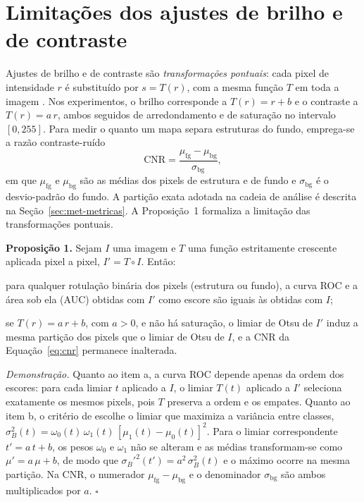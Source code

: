 \documentclass[12pt, oneside, a4paper, chapter=TITLE, section=TITLE,
               english, brazil]{abntex2}
\newcommand{\secao}[1]{\section[\texorpdfstring{\protect\MakeTextUppercase{#1}}{#1}]{#1}}
\newcommand{\cnr}{\mathrm{CNR}}
\begin{document}
\secao{Limitações dos ajustes de brilho e de contraste}
\label{sec:brilho}

Ajustes de brilho e de contraste são \emph{transformações pontuais}: cada
pixel de intensidade $r$ é substituído por $s = T(r)$, com a mesma função $T$
em toda a imagem \citep*{GonzalezWoods2018}. Nos experimentos, o brilho
corresponde a $T(r) = r + b$ e o contraste a $T(r) = a\,r$, ambos seguidos de
arredondamento e de saturação no intervalo $[0, 255]$. Para medir o quanto um
mapa separa estruturas do fundo, emprega-se a razão contraste-ruído
\begin{equation}
  \cnr = \frac{\mu_{\text{fg}} - \mu_{\text{bg}}}{\sigma_{\text{bg}}},
  \label{eq:cnr}
\end{equation}
em que $\mu_{\text{fg}}$ e $\mu_{\text{bg}}$ são as médias dos pixels de
estrutura e de fundo e $\sigma_{\text{bg}}$ é o desvio-padrão do fundo. A
partição exata adotada na cadeia de análise é descrita na
Seção~\ref{sec:met-metricas}. A Proposição~1 formaliza a limitação das
transformações pontuais.

\medskip
\noindent\textbf{Proposição 1.} Sejam $I$ uma imagem e $T$ uma função
estritamente crescente aplicada pixel a pixel, $I' = T \circ I$. Então:
\begin{alineas}
  \item para qualquer rotulação binária dos pixels (estrutura ou fundo), a
  curva ROC e a área sob ela (AUC) obtidas com $I'$ como escore são iguais às
  obtidas com $I$;
  \item se $T(r) = a\,r + b$, com $a > 0$, e não há saturação, o limiar de
  Otsu de $I'$ induz a mesma partição dos pixels que o limiar de Otsu de $I$,
  e a CNR da Equação~\eqref{eq:cnr} permanece inalterada.
\end{alineas}

\noindent\emph{Demonstração.} Quanto ao item a, a curva ROC depende apenas da
ordem dos escores: para cada limiar $t$ aplicado a $I$, o limiar $T(t)$
aplicado a $I'$ seleciona exatamente os mesmos pixels, pois $T$ preserva a
ordem e os empates. Quanto ao item b, o critério de \citet{Otsu1979} escolhe o
limiar que maximiza a variância entre classes,
$\sigma_B^2(t) = \omega_0(t)\,\omega_1(t)\,[\mu_1(t) - \mu_0(t)]^2$. Para o
limiar correspondente $t' = a\,t + b$, os pesos $\omega_0$ e $\omega_1$ não se
alteram e as médias transformam-se como $\mu' = a\,\mu + b$, de modo que
$\sigma_B'^2(t') = a^2\,\sigma_B^2(t)$ e o máximo ocorre na mesma partição. Na
CNR, o numerador $\mu_{\text{fg}} - \mu_{\text{bg}}$ e o denominador
$\sigma_{\text{bg}}$ são ambos multiplicados por $a$. \hfill$\square$
\medskip
\end{document}

